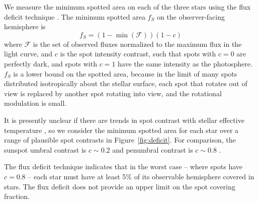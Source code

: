 We measure the minimum spotted area on each of the three stars using the flux deficit technique \citep[see e.g.][]{Morris2017a}. The minimum spotted area $f_S$ on the observer-facing hemisphere is 
\begin{equation}
f_S = (1 - \min(\mathcal{F})) (1 - c)
\end{equation}
where $\mathcal{F}$ is the set of observed fluxes normalized to the maximum flux in the light curve, and $c$ is the spot intensity contrast, such that spots with $c=0$ are perfectly dark, and spots with $c=1$ have the same intensity as the photosphere. $f_S$ is a lower bound on the spotted area, because in the limit of many spots distributed isotropically about the stellar surface, each spot that rotates out of view is replaced by another spot rotating into view, and the rotational modulation is small.

It is presently unclear if there are trends in spot contrast with stellar effective temperature \citep{Mancini2017}, so we consider the minimum spotted area for each star over a range of plausible spot contrasts in Figure~\ref{fig:deficit}. For comparison, the sunspot umbral contrast is $c\sim0.2$ and penumbral contrast is $c\sim0.8$ \citep{Solanki2003}. 

The flux deficit technique indicates that in the worst case -- where spots have $c=0.8$ -- each star must have at least 5\% of its observable hemisphere covered in stars. The flux deficit does not provide an upper limit on the spot covering fraction.



